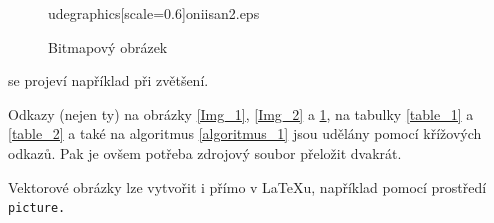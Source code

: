 \documentclass[a4paper, 11pt]{article}
\begin{document}
\begin{figure}[h]
udegraphics[scale=0.6]{oniisan2.eps}
	    \caption{Bitmapový obrázek}
	    \label{Img_3}
	\end{figure}
	\bigskip
	\noindent se projeví například při zvětšení.
	
	Odkazy (nejen ty) na obrázky \ref{Img_1}, \ref{Img_2} a \ref{Img_3}, na tabulky \ref{table_1} a \ref{table_2} a také na algoritmus \ref{algoritmus_1} jsou udělány pomocí křížových odkazů. Pak je ovšem potřeba zdrojový soubor přeložit dvakrát.
	
	Vektorové obrázky lze vytvořit i přímo v {\LaTeX}u, například pomocí prostředí \verb! picture.!
\end{document}

